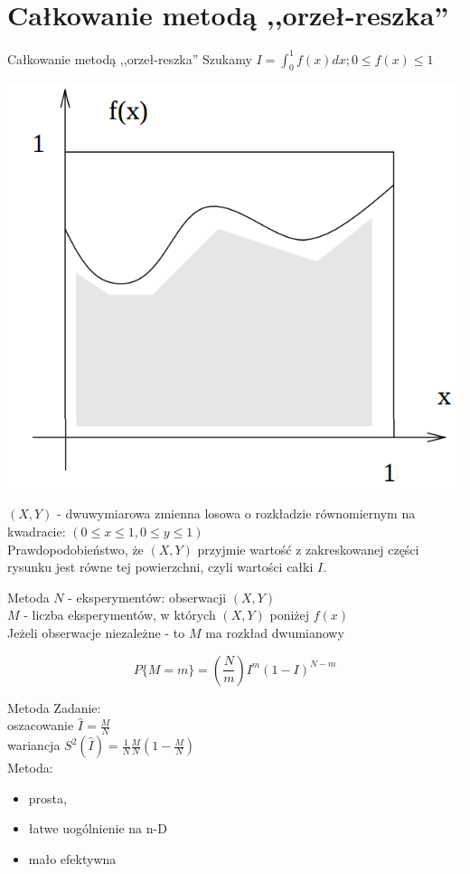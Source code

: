 \section{Całkowanie metodą ,,orzeł-reszka''}
\begin{frame}{Całkowanie metodą ,,orzeł-reszka''}
	Szukamy $I = \int_0^1 f(x) dx; 0 \le f(x) \le 1$
    
    {\centering 
    	\includegraphics[width=.4\linewidth]{img/15/15_1_orzel_reszka}
        \par
    }
    
    $(X, Y)$ - dwuwymiarowa zmienna losowa o rozkładzie równomiernym na kwadracie: $(0 \le x \le 1, 0 \le y \le 1)$ \\
    Prawdopodobieństwo, że $(X, Y)$ przyjmie wartość z zakreskowanej części rysunku jest równe tej powierzchni, czyli wartości całki $I$.
\end{frame}
\begin{frame}{Metoda}
	$N$ - eksperymentów: obserwacji $(X, Y)$ \\
    $M$ - liczba eksperymentów, w których $(X, Y)$ poniżej $f(x)$
    \\[8pt]
    Jeżeli obserwacje niezależne - to $M$ ma rozkład dwumianowy
    
    \[\boxed{
    	P\{M = m\} = \left(
            \frac{N}{m}
        \right) I^m (1-I)^{N-m}
    }\]
\end{frame}
\begin{frame}{Metoda}
	Zadanie:\\
    oszacowanie $\hat{I} = \frac{M}{N}$ \\
    wariancja $S^2(\hat{I}) = \frac{1}{N} \frac{M}{N} \left( 
    	1 - \frac{M}{N}
    \right)$ 
    \\[8pt]
    Metoda:
    \begin{itemize}
    	\item prosta,
        \item łatwe uogólnienie na n-D
        \item mało efektywna
    \end{itemize}
\end{frame}